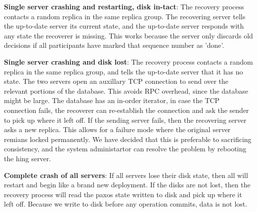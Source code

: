 \documentclass[letterpaper,10pt]{article}
\begin{document}
\textbf{Single server crashing and restarting, disk in-tact}: The
recovery process contacts a random replica in the same replica group.
The recovering server tells the up-to-date server its current state,
and the up-to-date server responds with any state the recoverer is
missing. This works because the server only discards old decisions if
all participants have marked that sequence number as 'done'.

\textbf{Single server crashing and disk lost}: The recovery process
contacts a random replica in the same replica group, and tells the
up-to-date server that it has no state. The two servers open an
auxillary TCP connection to send over the relevant portions of the
database. This avoids RPC overhead, since the database might be large.
The database has an in-order iterator, in case the TCP connection
fails, the recoverer can re-establish the connection and ask the
sender to pick up where it left off. If the sending server fails, then
the recovering server asks a new replica. This allows for a failure
mode where the original server remians locked permanently. We have
decided that this is preferable to sacrificing consistency, and the
system administartor can resolve the problem by rebooting the hing
server.

\textbf{Complete crash of all servers}: If all servers lose their disk
state, then all will restart and begin like a brand new deployment. If
the disks are not lost, then the recovery process will read the paxos
state written to disk and pick up where it left off. Because we write
to disk before any operation commits, data is not lost.


\end{document}
